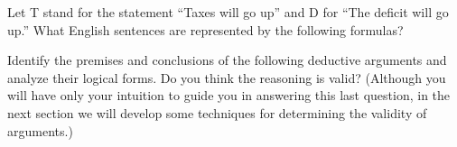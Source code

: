 \documentclass[addpoints,12pt]{exam}
\begin{document}
\begin{questions}

\question Let T stand for the statement “Taxes will go up” and D for “The
deficit will go up.” What English sentences are represented by the
following formulas?


\question Identify the premises and conclusions of the following deductive
arguments and analyze their logical forms. Do you think the reasoning
is valid? (Although you will have only your intuition to guide you in
answering this last question, in the next section we will develop some
techniques for determining the validity of arguments.)
\begin{parts}

\end{parts}
\end{questions}
\end{document}
